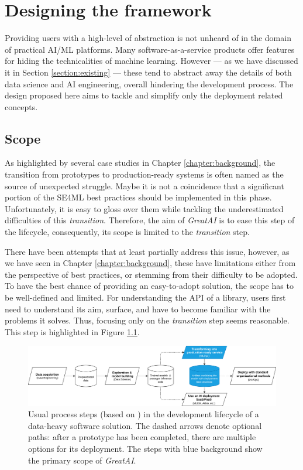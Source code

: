 \chapter{Designing the framework} \label{chapter:design}

Providing users with a high-level of abstraction is not unheard of in the domain of practical AI/ML platforms. Many software-as-a-service products offer features for hiding the technicalities of machine learning. However --- as we have discussed it in Section \ref{section:existing} --- these tend to abstract away the details of both data science and AI engineering, overall hindering the development process. The design proposed here aims to tackle and simplify only the deployment related concepts.

\section{Scope} \label{section:scope}

As highlighted by several case studies in Chapter \ref{chapter:background}, the transition from prototypes to production-ready systems is often named as the source of unexpected struggle. Maybe it is not a coincidence that a significant portion of the SE4ML best practices should be implemented in this phase. Unfortunately, it is easy to gloss over them while tackling the underestimated difficulties of this \textit{transition}. Therefore, the aim of \textit{GreatAI} is to ease this step of the lifecycle, consequently, its scope is limited to the \textit{transition} step.

There have been attempts that at least partially address this issue, however, as we have seen in Chapter \ref{chapter:background}, these have limitations either from the perspective of best practices, or stemming from their difficulty to be adopted. To have the best chance of providing an easy-to-adopt solution, the scope has to be well-defined and limited. For understanding the API of a library, users first need to understand its aim, surface, and have to become familiar with the problems it solves. Thus, focusing only on the \textit{transition} step seems reasonable. This step is highlighted in Figure \ref{fig:scope}.

\begin{figure}
    \centering
    \includegraphics[width=\linewidth]{figures/scope.drawio.png}
    \captionsetup{width=.9\linewidth}
    \caption{Usual process steps (based on \cite{john2020architecting}) in the development lifecycle of a data-heavy software solution. The dashed arrows denote optional paths: after a prototype has been completed, there are multiple options for its deployment. The steps with blue background show the primary scope of \textit{GreatAI}.}
    \label{fig:scope}
\end{figure}

